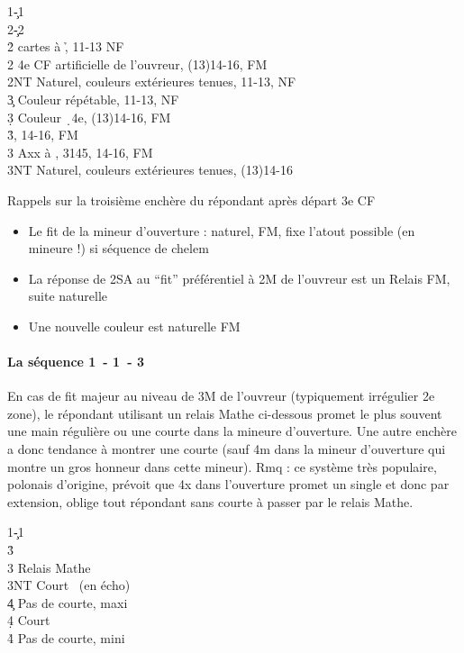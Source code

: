 \documentclass[a4paper]{article}
\begin{document}
\begin{bidtable}
1\c-1\d\\
2\c-2\d\\
2\h {} cartes à \h , 11-13 NF\\
2\s \> 4e CF artificielle de l'ouvreur, (13)14-16, FM\\
2NT \> Naturel, couleurs extérieures tenues, 11-13, NF\\
3\c \> Couleur répétable, 11-13, NF\\
3\d \> Couleur \d\ 4e, (13)14-16, FM\\
3\h {}, 14-16, FM\\
3\s \> Axx à \s , 3145, 14-16, FM\\
3NT \> Naturel, couleurs extérieures tenues, (13)14-16
\end{bidtable}

Rappels sur la troisième enchère du répondant après départ 3e CF

\begin{itemize}
\item Le fit de la mineur d'ouverture : naturel, FM, fixe l'atout possible (en mineure !) si séquence de chelem

\item La réponse de 2SA au ``fit'' préférentiel à 2M de l'ouvreur est un Relais FM, suite naturelle

\item Une nouvelle couleur est naturelle FM

\end{itemize}

\paragraph{La séquence 1\pdfc\ - 1\pdfd\ - 3\pdfh}

En cas de fit majeur au niveau de 3M de l'ouvreur (typiquement irrégulier 2e zone), le répondant utilisant un relais Mathe ci-dessous promet le plus souvent une main régulière ou une courte dans la mineure d'ouverture. Une autre enchère a donc tendance à montrer une courte (sauf 4m dans la mineur d'ouverture qui montre un gros 
honneur dans cette mineur). Rmq : ce système très populaire, polonais d'origine, prévoit que 4x dans l'ouverture promet un single et donc par extension, oblige tout répondant sans courte à passer par le relais Mathe.

\begin{bidtable}
1\c-1\d\\
3\h\+\\
3\s \> Relais Mathe\+\\
3NT \> Court \s\ (en écho)\\
4\c \> Pas de courte, maxi\\
4\d \> Court \d \\
4\h \> Pas de courte, mini\-\-
\end{bidtable}
\end{document}
